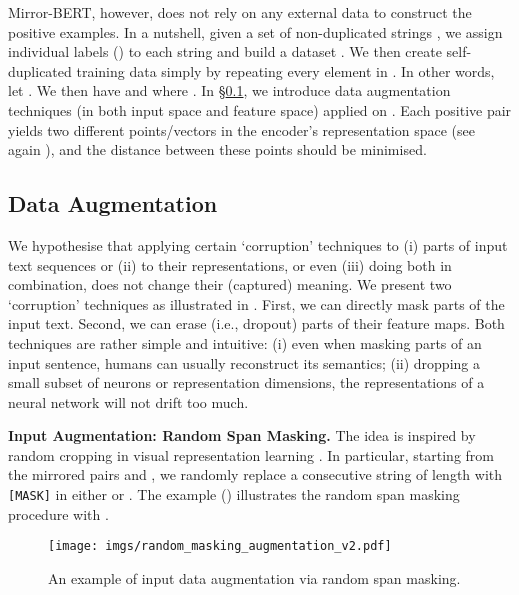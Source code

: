 \documentclass[11pt]{article}
\begin{document}
Mirror-BERT, however, does not rely on any external data to construct the positive examples. In a nutshell, given a set of non-duplicated strings , we assign individual labels () to each string and build a dataset . We then create self-duplicated training data  simply by repeating every element in .  
In other words, let . We then have  and  where . In \S\ref{sec:data_aug}, we introduce data augmentation techniques (in both input space and feature space) applied on . Each positive pair  yields two different points/vectors in the encoder's representation space (see again ), and the distance between these points should be minimised.

\subsection{Data Augmentation}\label{sec:data_aug}
We hypothesise that applying certain `corruption' techniques to (i) parts of input text sequences or (ii) to their representations, or even (iii) doing both in combination, does not change their (captured) meaning. We present two `corruption' techniques as illustrated in . First, we can directly mask parts of the input text. Second, we can erase (i.e., dropout) parts of their feature maps. Both techniques are rather simple and intuitive: (i) even when masking parts of an input sentence, humans can usually reconstruct its semantics; (ii) dropping a small subset of neurons or representation dimensions, the representations of a neural network will not drift too much.





\vspace{1.5mm}
\noindent \textbf{Input Augmentation: Random Span Masking.} The idea is inspired by random cropping in visual representation learning \cite{Hendrycks:2020augmix}. In particular, starting from the mirrored pairs  and , we randomly replace a consecutive string of length  with \texttt{[MASK]} in either  or . The example () illustrates the random span masking procedure with .

\begin{figure}
    \centering
    \texttt{[image: imgs/random\_masking\_augmentation\_v2.pdf]}
    \vspace{-1mm}
    \caption{An example of input data augmentation via random span masking.}
    \label{fig:random_mask_aug}
\end{figure}
\end{document}
